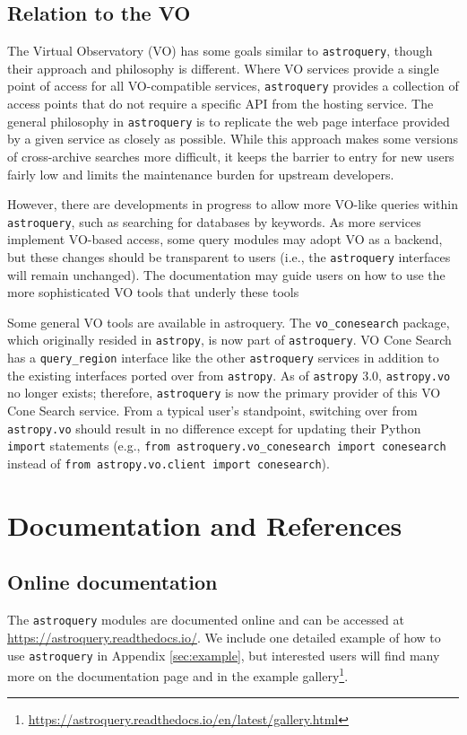 \documentclass[twocolumn]{aastex62}
\newcommand{\package}[1]{\texttt{#1}\xspace}
\newcommand{\astroquery}{\package{astroquery}}
\newcommand{\astropypkg}{\package{astropy}}
\begin{document}
\subsection{Relation to the VO}
\label{sec:vo}

The Virtual Observatory (VO) has some goals similar to \astroquery,
though their approach and philosophy is different.  Where VO services provide a
single point of access for all VO-compatible services, \astroquery
provides a collection of access points that do not require a specific API from
the hosting service.  The general philosophy in \astroquery is to
replicate the web page interface provided by a given service as closely as
possible.  While this approach makes some versions of cross-archive searches
more difficult, it keeps the barrier to entry for new users fairly low and limits
the maintenance burden for upstream developers.

However, there are developments in progress to allow more VO-like queries
within \astroquery, such as searching for databases by keywords.  As more
services implement VO-based access, some query modules may adopt VO as a backend,
but these changes should be transparent to users (i.e., the \astroquery
interfaces will remain unchanged).  The documentation may guide users on how
to use the more sophisticated VO tools that underly these tools


Some general VO tools are available in astroquery.  The \texttt{vo\_conesearch}
package, which originally resided in \astropypkg, is now part of \astroquery.  VO
Cone Search has a \texttt{query\_region} interface like the other \astroquery
services in addition to the existing interfaces ported over from \astropypkg.
As of \astropypkg 3.0, \texttt{astropy.vo} no longer exists; therefore,
\astroquery is now the primary provider of this VO Cone Search service. From a
typical user's standpoint, switching over from \texttt{astropy.vo} should
result in no difference except for updating their Python \texttt{import}
statements (e.g., \texttt{from astroquery.vo\_conesearch import conesearch}
instead of \texttt{from astropy.vo.client import conesearch}).



\section{Documentation and References}
\label{sec:documentation}
\subsection{Online documentation}
The \astroquery modules are documented online and can be accessed  at
\url{https://astroquery.readthedocs.io/}.  We include one detailed example of
how to use \astroquery in Appendix \ref{sec:example},
but interested users will find many more on the documentation page and
in the example gallery\footnote{\url{https://astroquery.readthedocs.io/en/latest/gallery.html}}.
\end{document}
